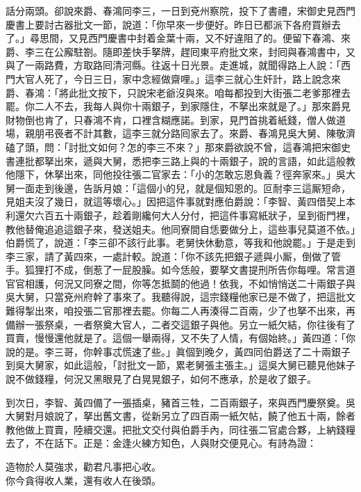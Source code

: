 話分兩頭。卻說來爵、春鴻同李三，一日到兗州察院，投下了書禮，宋御史見西門慶書上要討古器批文一節，說道：「你早來一步便好。昨日已都派下各府買辦去了。」尋思間，又見西門慶書中封着金葉十兩，又不好違阻了的。便留下春鴻、來爵、李三在公廨駐劄。隨即差快手拏牌，趕囘東平府批文來，封囘與春鴻書中，又與了一兩路費，方取路囘清河縣。往返十日光景。走進城，就聞得路上人說：「西門大官人死了，今日三日，家中念經做齋哩。」這李三就心生奸計，路上說念來爵、春鴻：「將此批文按下，只說宋老爺沒與來。咱每都投到大街張二老爹那裡去罷。{}你二人不去，我每人與你十兩銀子，到家隱住，不拏出來就是了。」那來爵見財物倒也肯了，只春鴻不肯，口裡含糊應諾。{}到家，見門首挑着紙錢，僧人做道場，親朋弔䘮者不計其數，這李三就分路囘家去了。來爵、春鴻見吳大舅、陳敬濟磕了頭，問：「討批文如何？怎的李三不來？」那來爵欲說不曾，這春鴻把宋御史書連批都拏出來，遞與大舅，悉把李三路上與的十兩銀子，說的言語，如此這般教他隱下，休拏出來，同他投往張二官家去：「小的怎敢忘恩負義？徑奔家來。」吳大舅一面走到後邊，告訴月娘：「這個小的兒，就是個知恩的。叵耐李三這厮短命，見姐夫沒了幾日，就這等壞心。」{}因把這件事就對應伯爵說：「李智、黃四借契上本利還欠六百五十兩銀子，趁着剛纔何大人分付，把這件事寫紙狀子，呈到衙門裡，教他替俺追追這銀子來，發送姐夫。他同寮間自恁要做分上，這些事兒莫道不依。」伯爵慌了，說道：「李三卻不該行此事。老舅快休動意，等我和他說罷。」于是走到李三家，請了黃四來，一處計較。說道：「你不該先把銀子遞與小厮，倒做了管手。狐狸打不成，倒惹了一屁股臊。如今恁般，要拏文書提刑所告你每哩。常言道官官相護，何況又同寮之間，你等怎抵鬬的他過！依我，不如悄悄送二十兩銀子與吳大舅，只當兗州府幹了事來了。我聽得說，這宗錢糧他家已是不做了，把這批文難得掣出來，咱投張二官那裡去罷。你每二人再湊得二百兩，少了也拏不出來，再備辦一張祭桌，一者祭奠大官人，二者交這銀子與他。另立一紙欠結，你往後有了買賣，慢慢還他就是了。這個一舉兩得，又不失了人情，有個始終。」{}黃四道：「你說的是。李三哥，你幹事忒慌速了些。」眞個到晚夕，黃四同伯爵送了二十兩銀子到吳大舅家，如此這般，「討批文一節，累老舅張主張主。」這吳大舅已聽見他妹子說不做錢糧，何況又黑眼見了白晃晃銀子，如何不應承，於是收了銀子。

到次日，李智、黃四備了一張插桌，豬首三牲，二百兩銀子，來與西門慶祭奠。吳大舅對月娘說了，拏出舊文書，從新另立了四百兩一紙欠帖，饒了他五十兩，餘者教他做上買賣，陸續交還。把批文交付與伯爵手內，同往張二官處合夥，上納錢糧去了，不在話下。正是：金逢火練方知色，人與財交便見心。有詩為證：

\begin{myquote} 
造物於人莫強求，勸君凡事把心收。\\你今貪得收人業，還有收人在後頭。{}
\end{myquote} 

